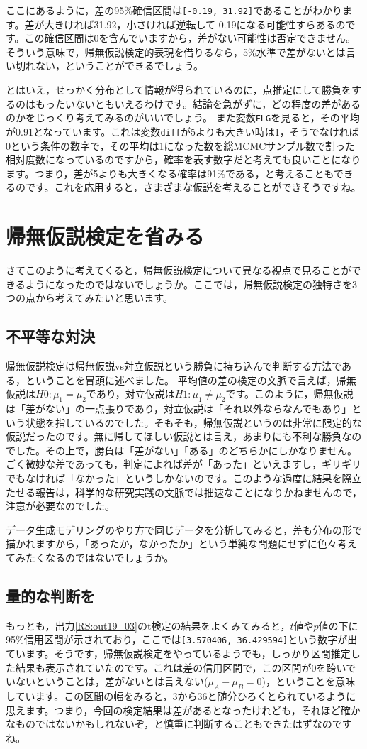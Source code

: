 \documentclass{ltjsbook}
\begin{document}
ここにあるように，差の95\%確信区間は\verb|[-0.19, 31.92]|であることがわかります。差が大きければ31.92，小さければ逆転して-0.19になる可能性すらあるのです。この確信区間は0を含んでいますから，差がない可能性は否定できません。そういう意味で，帰無仮説検定的表現を借りるなら，5\%水準で差がないとは言い切れない，ということができるでしょう。

とはいえ，せっかく分布として情報が得られているのに，点推定にして勝負をするのはもったいないともいえるわけです。結論を急がずに，どの程度の差があるのかをじっくり考えてみるのがいいでしょう。
また変数\verb|FLG|を見ると，その平均が0.91となっています。これは変数\verb|diff|が5よりも大きい時は1，そうでなければ0という条件の数字で，その平均は1になった数を総MCMCサンプル数で割った相対度数になっているのですから，確率を表す数字だと考えても良いことになります。つまり，差が5よりも大きくなる確率は91\%である，と考えることもできるのです。これを応用すると，さまざまな仮説を考えることができそうですね。

\section{帰無仮説検定を省みる}
さてこのように考えてくると，帰無仮説検定について異なる視点で見ることができるようになったのではないでしょうか。ここでは，帰無仮説検定の独特さを3つの点から考えてみたいと思います。
\subsection{不平等な対決}
帰無仮説検定は帰無仮説vs対立仮説という勝負に持ち込んで判断する方法である，ということを冒頭に述べました。
平均値の差の検定の文脈で言えば，帰無仮説は$H0:\mu_1=\mu_2$であり，対立仮説は$H1:\mu_1\neq\mu_2$です。このように，帰無仮説は「差がない」の一点張りであり，対立仮説は「それ以外ならなんでもあり」という状態を指しているのでした。そもそも，帰無仮説というのは非常に限定的な仮説だったのです。無に帰してほしい仮説とは言え，あまりにも不利な勝負なのでした。その上で，勝負は「差がない」「ある」のどちらかにしかなりません。ごく微妙な差であっても，判定によれば差が「あった」といえますし，ギリギリでもなければ「なかった」というしかないのです。このような過度に結果を際立たせる報告は，科学的な研究実践の文脈では拙速なことになりかねませんので，注意が必要なのでした。

データ生成モデリングのやり方で同じデータを分析してみると，差も分布の形で描かれますから，「あったか，なかったか」という単純な問題にせずに色々考えてみたくなるのではないでしょうか。
\subsection{量的な判断を}
もっとも，出力\ref{RS:out19_03}のt検定の結果をよくみてみると，$t$値や$p$値の下に95\%信用区間が示されており，ここでは\verb|[3.570406, 36.429594]|という数字が出ています。そうです，帰無仮説検定をやっているようでも，しっかり区間推定した結果も表示されていたのです。これは差の信用区間で，この区間が0を跨いでいないということは，差がないとは言えない($\mu_A-\mu_B=0$)，ということを意味しています。この区間の幅をみると，3から36と随分ひろくとられているように思えます。つまり，今回の検定結果は差があるとなったけれども，それほど確かなものではないかもしれないぞ，と慎重に判断することもできたはずなのですね。
\end{document}
